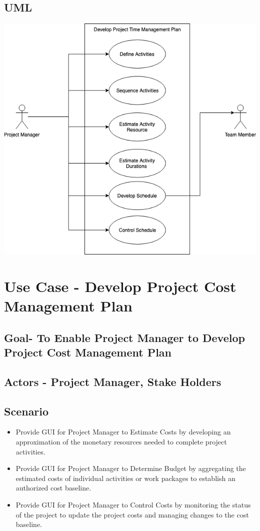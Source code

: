 \documentclass[10pt]{article}
\begin{document}
\subsection{UML}
\includegraphics[width=\textwidth]{usecase1}

\newpage
\section{Use Case - Develop Project Cost Management Plan}
\subsection{Goal- To Enable Project Manager to Develop Project Cost Management Plan}
\subsection{Actors - Project Manager, Stake Holders}
\subsection{Scenario}
\begin{itemize}
  \item Provide GUI for Project Manager to Estimate Costs by developing an approximation of the monetary resources needed to complete project activities.
  \item Provide GUI for Project Manager to Determine Budget by aggregating the estimated costs of individual activities or work packages to establish an authorized cost baseline.
  \item Provide GUI for Project Manager to Control Costs by monitoring the status of the project to update the project costs and managing changes to the cost baseline.
  
\end{itemize}
\end{document}
